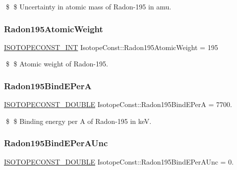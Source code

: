 \$ \$ Uncertainty in atomic mass of Radon-\/195 in amu. \mbox{\label{group___isotope_const-_radon-_rn195_ga0ae5ccd65789bb6f5120d52b41aee27e}} 
\subsubsection{\texorpdfstring{Radon195\+Atomic\+Weight}{Radon195AtomicWeight}}
{\footnotesize\ttfamily \mbox{\hyperlink{group___isotope_const-_macros_ga5f18360b3e99483a35c32d789e62621c}{I\+S\+O\+T\+O\+P\+E\+C\+O\+N\+S\+T\+\_\+\+I\+NT}} Isotope\+Const\+::\+Radon195\+Atomic\+Weight = 195}

\$ \$ Atomic weight of Radon-\/195. \mbox{\label{group___isotope_const-_radon-_rn195_ga7471edaeb746d2ca7301ea12ea38c7d5}} 
\subsubsection{\texorpdfstring{Radon195\+Bind\+E\+PerA}{Radon195BindEPerA}}
{\footnotesize\ttfamily \mbox{\hyperlink{group___isotope_const-_macros_ga8f45a7272ce02c0b4c65c44636ed719a}{I\+S\+O\+T\+O\+P\+E\+C\+O\+N\+S\+T\+\_\+\+D\+O\+U\+B\+LE}} Isotope\+Const\+::\+Radon195\+Bind\+E\+PerA = 7700.}

\$ \$ Binding energy per A of Radon-\/195 in keV. \mbox{\label{group___isotope_const-_radon-_rn195_ga71548c8b5f90eed7e8b8040bffbac9cb}} 
\subsubsection{\texorpdfstring{Radon195\+Bind\+E\+Per\+A\+Unc}{Radon195BindEPerAUnc}}
{\footnotesize\ttfamily \mbox{\hyperlink{group___isotope_const-_macros_ga8f45a7272ce02c0b4c65c44636ed719a}{I\+S\+O\+T\+O\+P\+E\+C\+O\+N\+S\+T\+\_\+\+D\+O\+U\+B\+LE}} Isotope\+Const\+::\+Radon195\+Bind\+E\+Per\+A\+Unc = 0.}

